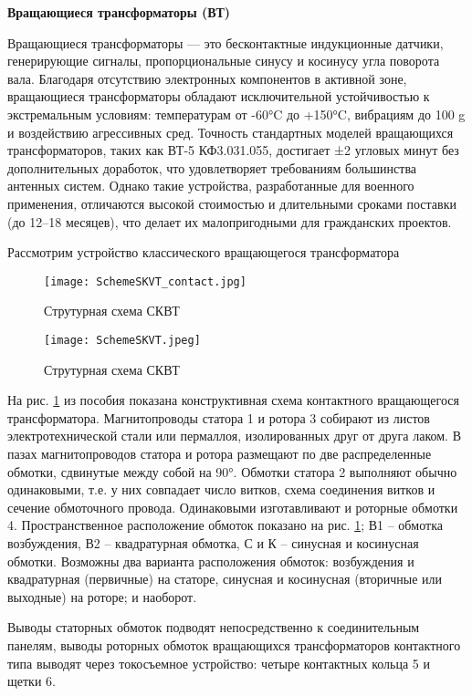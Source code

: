 \textbf{Вращающиеся трансформаторы (ВТ)}

Вращающиеся трансформаторы — это бесконтактные индукционные датчики, генерирующие сигналы, пропорциональные синусу и косинусу угла поворота вала. 
Благодаря отсутствию электронных компонентов в активной зоне, вращающиеся трансформаторы обладают исключительной устойчивостью к экстремальным условиям: температурам от -60°C до +150°C, 
вибрациям до 100 g и воздействию агрессивных сред.
Точность стандартных моделей вращающихся трансформаторов, таких как ВТ-5 КФ3.031.055, достигает ±2 угловых минут без дополнительных доработок, 
что удовлетворяет требованиям большинства антенных систем. 
Однако такие устройства, разработанные для военного применения, отличаются высокой стоимостью и длительными сроками поставки (до 12–18 месяцев), 
что делает их малопригодными для гражданских проектов.

Рассмотрим устройство классического вращающегося трансформатора

\begin{figure}[!t]
  \centering
  \texttt{[image: SchemeSKVT\_contact.jpg]}
  \caption{Струтурная схема СКВТ}
  \label{SchemeSKVT_Contact}
\end{figure}

\begin{figure}[!t]
  \centering
  \texttt{[image: SchemeSKVT.jpeg]}
  \caption{Струтурная схема СКВТ}
  \label{SchemeSKVT}
\end{figure}

На рис. \ref{SchemeSKVT_Contact} из пособия \cite{AutoDevices} показана конструктивная схема контактного вращающегося трансформатора. 
Магнитопроводы статора 1 и ротора 3 собирают из листов электротехнической стали или пермаллоя, 
изолированных друг от друга лаком. В пазах магнитопроводов статора и ротора размещают по две распределенные обмотки, сдвинутые между собой на 90°. 
Обмотки статора 2 выполняют обычно одинаковыми, т.е. у них совпадает число витков, схема соединения витков и сечение обмоточного провода. 
Одинаковыми изготавливают и роторные обмотки 4. Пространственное расположение обмоток показано на рис. \ref{SchemeSKVT_Contact}; В1 – обмотка возбуждения, В2 – квадратурная обмотка, 
С и К – синусная и косинусная обмотки. Возможны два варианта расположения обмоток: возбуждения и квадратурная (первичные) на статоре, 
синусная и косинусная (вторичные или выходные) на роторе; и наоборот. 

Выводы статорных обмоток подводят непосредственно к соединительным панелям, выводы роторных обмоток вращающихся трансформаторов контактного типа 
выводят через токосъемное устройство: четыре контактных кольца 5 и щетки 6.

